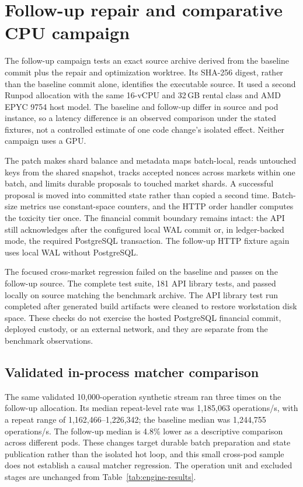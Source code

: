 \documentclass[envcountsame,runningheads,notitlepage]{llncs}
\newcommand{\pathref}[1]{\texttt{\detokenize{#1}}}
\begin{document}
\section{Follow-up repair and comparative CPU campaign}\label{sec:followup}
The follow-up campaign tests an exact source archive derived from the baseline commit plus the repair and optimization worktree. Its SHA-256 digest, rather than the baseline commit alone, identifies the executable source. It used a second Runpod \pathref{cpu3c} allocation with the same 16-vCPU and 32\,GB rental class and AMD EPYC 9754 host model. The baseline and follow-up differ in source and pod instance, so a latency difference is an observed comparison under the stated fixtures, not a controlled estimate of one code change's isolated effect. Neither campaign uses a GPU.

The patch makes shard balance and metadata maps batch-local, reads untouched keys from the shared snapshot, tracks accepted nonces across markets within one batch, and limits durable proposals to touched market shards. A successful proposal is moved into committed state rather than copied a second time. Batch-size metrics use constant-space counters, and the HTTP order handler computes the toxicity tier once. The financial commit boundary remains intact: the API still acknowledges after the configured local WAL commit or, in ledger-backed mode, the required PostgreSQL transaction. The follow-up HTTP fixture again uses local WAL without PostgreSQL.\cite{source}

The focused cross-market regression failed on the baseline and passes on the follow-up source. The complete \pathref{engine} test suite, 181 API library tests, and \pathref{cargo check -p api} passed locally on source matching the benchmark archive. The API library test run completed after generated build artifacts were cleaned to restore workstation disk space. These checks do not exercise the hosted PostgreSQL financial commit, deployed custody, or an external network, and they are separate from the benchmark observations.

\subsection{Validated in-process matcher comparison}
The same validated 10,000-operation synthetic stream ran three times on the follow-up allocation. Its median repeat-level rate was 1,185,063 operations/s, with a repeat range of 1,162,466--1,226,342; the baseline median was 1,244,755 operations/s. The follow-up median is 4.8\% lower as a descriptive comparison across different pods. These changes target durable batch preparation and state publication rather than the isolated \pathref{MatchingEngine::process} hot loop, and this small cross-pod sample does not establish a causal matcher regression. The operation unit and excluded stages are unchanged from Table~\ref{tab:engine-results}.\cite{benchdata,rebenchdata}
\end{document}
